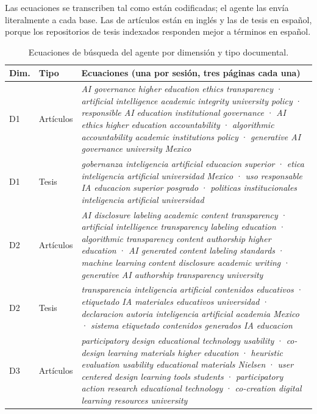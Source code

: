\documentclass[letter,12pt]{article}
\begin{document}
Las ecuaciones se transcriben tal como están codificadas; el agente las envía literalmente a cada base. Las de artículos están en inglés y las de tesis en español, porque los repositorios de tesis indexados responden mejor a términos en español.

\begin{table}[H]
\centering
\footnotesize
\caption{Ecuaciones de búsqueda del agente por dimensión y tipo documental.}
\label{tab:ecuaciones-agente}
\renewcommand{\arraystretch}{1.3}
\begin{tabular}{|p{1.1cm}|p{1.3cm}|p{10.2cm}|}
\hline
\rowcolor{bgCotejo}
\textbf{Dim.} & \textbf{Tipo} & \textbf{Ecuaciones (una por sesión, tres páginas cada una)} \\
\hline
D1 & Artículos & \textit{AI governance higher education ethics transparency} · \textit{artificial intelligence academic integrity university policy} · \textit{responsible AI education institutional governance} · \textit{AI ethics higher education accountability} · \textit{algorithmic accountability academic institutions policy} · \textit{generative AI governance university Mexico} \\
\hline
D1 & Tesis & \textit{gobernanza inteligencia artificial educacion superior} · \textit{etica inteligencia artificial universidad Mexico} · \textit{uso responsable IA educacion superior posgrado} · \textit{politicas institucionales inteligencia artificial universidad} \\
\hline
D2 & Artículos & \textit{AI disclosure labeling academic content transparency} · \textit{artificial intelligence transparency labeling education} · \textit{algorithmic transparency content authorship higher education} · \textit{AI generated content labeling standards} · \textit{machine learning content disclosure academic writing} · \textit{generative AI authorship transparency university} \\
\hline
D2 & Tesis & \textit{transparencia inteligencia artificial contenidos educativos} · \textit{etiquetado IA materiales educativos universidad} · \textit{declaracion autoria inteligencia artificial academia Mexico} · \textit{sistema etiquetado contenidos generados IA educacion} \\
\hline
D3 & Artículos & \textit{participatory design educational technology usability} · \textit{co-design learning materials higher education} · \textit{heuristic evaluation usability educational materials Nielsen} · \textit{user centered design learning tools students} · \textit{participatory action research educational technology} · \textit{co-creation digital learning resources university} \\

\end{tabular}
\end{table}
\end{document}
